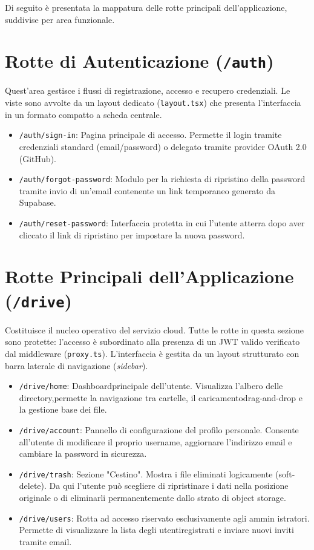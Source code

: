 \documentclass[12pt,a4paper]{report}
\begin{document}
Di seguito è presentata la mappatura delle rotte principali
dell'applicazione, suddivise per area funzionale.

\section{Rotte di Autenticazione (\texttt{/auth})}
Quest'area gestisce i flussi di registrazione, accesso e recupero
credenziali. Le viste sono avvolte da un layout dedicato
(\texttt{layout.tsx}) che presenta l'interfaccia in un formato
compatto a scheda centrale.
\begin{itemize}
  \item \texttt{/auth/sign-in}: Pagina principale di accesso.
    Permette il login tramite credenziali standard (email/password) o
    delegato tramite provider OAuth 2.0 (GitHub).
  \item \texttt{/auth/forgot-password}: Modulo per la richiesta di
    ripristino della password tramite invio di un'email contenente un
    link temporaneo generato da Supabase.
  \item \texttt{/auth/reset-password}: Interfaccia protetta in cui
    l'utente atterra dopo aver cliccato il link di ripristino per
    impostare la nuova password.
\end{itemize}

\section{Rotte Principali dell'Applicazione (\texttt{/drive})}
Costituisce il nucleo operativo del servizio cloud. Tutte le rotte in
questa sezione sono protette: l'accesso è subordinato alla presenza
di un JWT valido verificato dal middleware (\texttt{proxy.ts}).
L'interfaccia è gestita da un layout strutturato con barra laterale
di navigazione (\textit{sidebar}).
\begin{itemize}
  \item \texttt{/drive/home}: Dashboardprincipale dell'utente.
    Visualizza l'albero delle directory,permette la navigazione tra
    cartelle, il caricamentodrag-and-drop e la gestione base dei file.
  \item \texttt{/drive/account}: Pannello di configurazione del
    profilo personale. Consente all'utente di modificare il proprio
    username, aggiornare l'indirizzo email e cambiare la password in sicurezza.
  \item \texttt{/drive/trash}: Sezione "Cestino". Mostra i file
    eliminati logicamente (soft-delete). Da qui l'utente può
    scegliere di ripristinare i dati nella posizione originale o di
    eliminarli permanentemente dallo strato di object storage.
  \item \texttt{/drive/users}: Rotta ad accesso riservato
    esclusivamente agli ammin istratori. Permette di visualizzare la
    lista degli utentiregistrati e inviare nuovi inviti tramite email.
\end{itemize}
\end{document}
